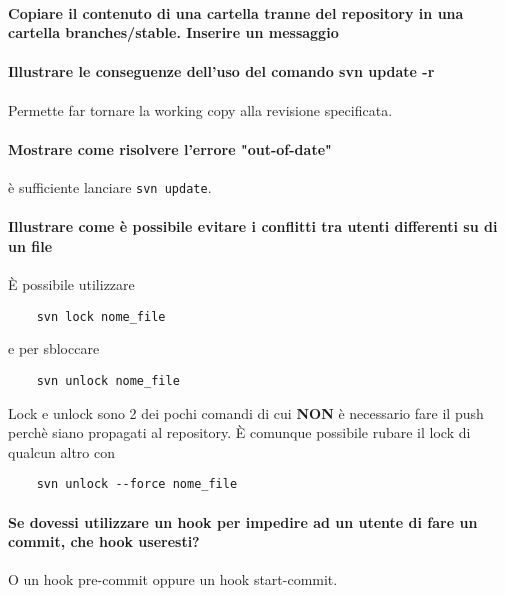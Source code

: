\documentclass[a4paper]{article}
\begin{document}
	\paragraph{Copiare il contenuto di una cartella tranne del repository in una cartella branches/stable. Inserire un messaggio}

	\paragraph{Illustrare le conseguenze dell'uso del comando svn update -r}
	Permette far tornare la working copy alla revisione specificata.

	\paragraph{Mostrare come risolvere l'errore "out-of-date"} è sufficiente lanciare \verb|svn update|.

	\paragraph{Illustrare come è possibile evitare i conflitti tra utenti differenti su di un file}
	È possibile utilizzare
	\begin{verbatim}
	svn lock nome_file
	\end{verbatim}
	e per sbloccare 
	\begin{verbatim}
	svn unlock nome_file
	\end{verbatim}
	Lock e unlock sono 2 dei pochi comandi di cui \textbf{NON} è necessario fare il push perchè siano propagati al repository.
	È comunque possibile rubare il lock di qualcun altro con
	\begin{verbatim}
	svn unlock --force nome_file
	\end{verbatim}

	\paragraph{Se dovessi utilizzare un hook per impedire ad un utente di fare un commit, che hook useresti?} O un hook pre-commit oppure un hook start-commit.
\end{document}

